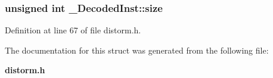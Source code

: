 \subsubsection[{size}]{\setlength{\rightskip}{0pt plus 5cm}unsigned int {\bf \_\-DecodedInst::size}}\label{struct__DecodedInst_e392ec7573ed166c5c0b856455c1e3ec}




Definition at line 67 of file distorm.h.

The documentation for this struct was generated from the following file:\begin{CompactItemize}
\item 
{\bf distorm.h}\end{CompactItemize}
